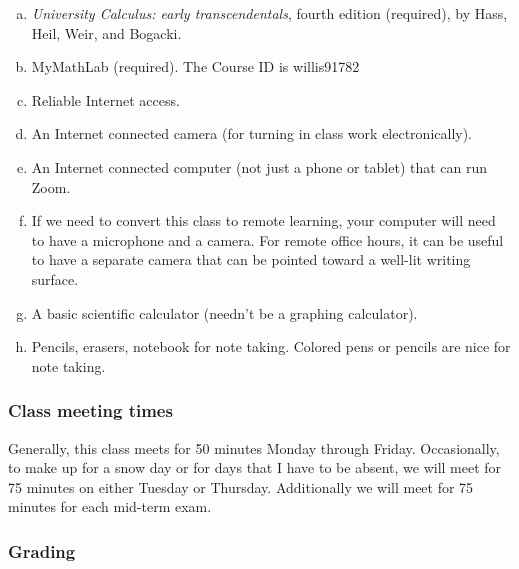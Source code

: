 \documentclass[12pt]{article}
\newcounter{ex}\setcounter{ex}{0}
\newenvironment{alphalist}{
  \begin{enumerate}[(a)]
    \addtolength{\itemsep}{-0.5\itemsep}}
  {\end{enumerate}}
\begin{document}
\begin{alphalist}

\item \emph{University Calculus: early transcendentals}, fourth edition (required), by Hass,  Heil, Weir, and Bogacki.

\item MyMathLab (required).  The Course ID is willis91782 

\item Reliable Internet access.

\item An Internet connected camera (for turning in class work electronically).

\item  An Internet connected computer (not just a phone or tablet) that can run Zoom. 

\item If we need to convert this class to remote learning, your computer will need to have a microphone and a camera. For remote office hours, it can be useful to have a separate camera that can be pointed toward a well-lit writing surface.

\item A basic scientific calculator (needn't be a graphing calculator).

\item Pencils, erasers, notebook for note taking. Colored pens or pencils are nice for note taking.

\end{alphalist}

\subsubsection*{Class meeting times}

Generally, this  class meets for 50 minutes Monday through Friday. 
Occasionally, to make up for a snow day or for days that I have to 
be absent,  we will meet for 75 minutes on 
either Tuesday or Thursday. Additionally we will meet for 
75 minutes for each mid-term exam. 

\subsubsection*{Grading}
\end{document}
